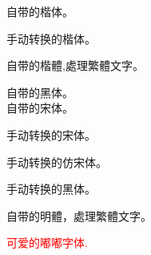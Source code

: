 \documentclass[12pt,a4paper,CJK]{beamer}
\begin{document}
\begin{CJK*}{UTF8}{gkai}
自带的楷体。\\
\end{CJK*}

\begin{CJK*}{UTF8}{kai}
手动转换的楷体。\\
\end{CJK*}

\begin{CJK*}{UTF8}{bkai}
自带的楷體,處理繁體文字。
\end{CJK*}

\begin{CJK*}{UTF8}{gbsn}
自带的黑体。\\
自带的宋体。\\
\end{CJK*}

\begin{CJK*}{UTF8}{song}
手动转换的宋体。\\
\end{CJK*}

\begin{CJK*}{UTF8}{fang}
手动转换的仿宋体。\\
\end{CJK*}

\begin{CJK*}{UTF8}{hei}
手动转换的黑体。\\
\end{CJK*}

\begin{CJK*}{UTF8}{bsmi}
自带的明體，處理繁體文字。
\end{CJK*}

\begin{CJK*}{UTF8}{du}
\textcolor{red}{可爱的嘟嘟字体.}\\
\end{CJK*}
\end{document}

